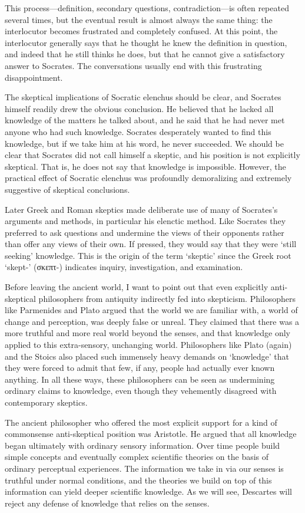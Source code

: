 This process---definition, secondary questions, contradiction---is often repeated several times, but the eventual result is almost always the same thing: the interlocutor becomes frustrated and completely confused. At this point, the interlocutor generally says that he thought he knew the definition in question, and indeed that he still thinks he does, but that he cannot give a satisfactory answer to Socrates. The conversations usually end with this frustrating disappointment.

The skeptical implications of Socratic elenchus should be clear, and Socrates himself readily drew the obvious conclusion. He believed that he lacked all knowledge of the matters he talked about, and he said that he had never met anyone who had such knowledge. Socrates desperately wanted to find this knowledge, but if we take him at his word, he never succeeded. We should be clear that Socrates did not call himself a skeptic, and his position is not explicitly skeptical. That is, he does not say that knowledge is impossible. However, the practical effect of Socratic elenchus was profoundly demoralizing and extremely suggestive of skeptical conclusions.

Later Greek and Roman skeptics made deliberate use of many of Socrates's arguments and methods, in particular his elenctic method. Like Socrates they preferred to ask questions and undermine the views of their opponents rather than offer any views of their own. If pressed, they would say that they were `still seeking' knowledge. This is the origin of the term `skeptic' since the Greek root `skept-' (\textgreek{σκεπτ}-) indicates inquiry, investigation, and examination.

Before leaving the ancient world, I want to point out that even explicitly anti-skeptical philosophers from antiquity indirectly fed into skepticism. Philosophers like Parmenides and Plato argued that the world we are familiar with, a world of change and perception, was deeply false or unreal. They claimed that there was a more truthful and more real world beyond the senses, and that knowledge only applied to this extra-sensory, unchanging world. Philosophers like Plato (again) and the Stoics also placed such immensely heavy demands on `knowledge' that they were forced to admit that few, if any, people had actually ever known anything. In all these ways, these philosophers can be seen as undermining ordinary claims to knowledge, even though they vehemently disagreed with contemporary skeptics.

The ancient philosopher who offered the most explicit support for a kind of commonsense anti-skeptical position was Aristotle. He argued that all knowledge began ultimately with ordinary sensory information. Over time people build simple concepts and eventually complex scientific theories on the basis of ordinary perceptual experiences. The information we take in via our senses is truthful under normal conditions, and the theories we build on top of this information can yield deeper scientific knowledge. As we will see, Descartes will reject any defense of knowledge that relies on the senses.

